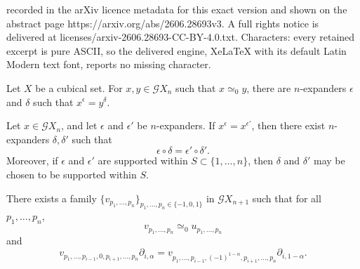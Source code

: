\documentclass[10pt,a4paper]{amsart}
\begin{document}
recorded in the arXiv licence metadata for this exact version and shown on the abstract page https://arxiv.org/abs/2606.28693v3. A full rights notice is delivered at licenses/arxiv-2606.28693-CC-BY-4.0.txt. Characters: every retained excerpt is pure ASCII, so the delivered engine, XeLaTeX with its default Latin Modern text font, reports no missing character.
	\begin{lemma}
		\label{common expansion}
		Let $X$ be a cubical set. For $x,y\in\mathcal{G}X_n$ such that $x\simeq_0y$, there are $n$-expanders $\epsilon$ and $\delta$ such that $x^\epsilon=y^\delta$.
	\end{lemma}

	\begin{lemma}
		\label{stabilization}
		Let $x\in\mathcal{G}X_n$, and let $\epsilon$ and $\epsilon'$ be $n$-expanders. If $x^{\epsilon}=x^{\epsilon'}$, then there exist $n$-expanders $\delta,\delta'$ such that
		\[
		\epsilon\circ\delta=\epsilon'\circ\delta'.
		\]
		Moreover, if $\epsilon$ and $\epsilon'$ are supported within $S\subset\{1,\ldots,n\}$, then $\delta$ and $\delta'$ may be chosen to be supported within $S$.
	\end{lemma}

	\begin{proposition}
		\label{gluing grids}
		There exists a family $\{v_{p_1,\ldots,p_n}\}_{p_1,\ldots,p_n\in\{-1,0,1\}}$ in $\mathcal{G}X_{n+1}$ such that for all $p_1,\ldots,p_n$,
		\[
		v_{p_1,\ldots,p_n}\simeq_0 u_{p_1,\ldots,p_n}
		\]
		and
		\[
		v_{p_1,\ldots,p_{i-1},0,p_{i+1},\ldots,p_n}\partial_{i,\alpha}=v_{p_1,\ldots,p_{i-1},(-1)^{1-\alpha},p_{i+1},\ldots,p_n}\partial_{i,1-\alpha}.
		\]
	\end{proposition}
\end{document}
